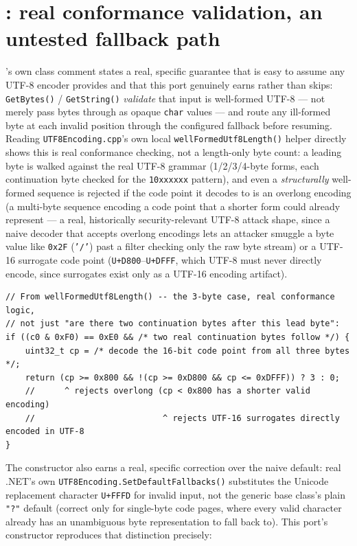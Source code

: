 \section{: real conformance validation, an untested fallback path}

's own class comment states a real, specific guarantee that is
easy to assume any UTF-8 encoder provides and that this port genuinely earns rather than
skips: \texttt{GetBytes()} / \texttt{GetString()} \emph{validate} that input is well-formed
UTF-8 --- not merely pass bytes through as opaque \texttt{char} values --- and route any
ill-formed byte at each invalid position through the configured fallback before resuming.
Reading \texttt{UTF8Encoding.cpp}'s own local \texttt{wellFormedUtf8Length()} helper directly
shows this is real conformance checking, not a length-only byte count: a leading byte is
walked against the real UTF-8 grammar (1/2/3/4-byte forms, each continuation byte checked for
the \texttt{10xxxxxx} pattern), and even a \emph{structurally} well-formed sequence is rejected
if the code point it decodes to is an overlong encoding (a multi-byte sequence encoding a code
point that a shorter form could already represent --- a real, historically security-relevant
UTF-8 attack shape, since a naive decoder that accepts overlong encodings lets an attacker
smuggle a byte value like \texttt{0x2F} (\texttt{'/'}) past a filter checking only the raw byte
stream) or a UTF-16 surrogate code point (\texttt{U+D800}--\texttt{U+DFFF}, which UTF-8 must
never directly encode, since surrogates exist only as a UTF-16 encoding artifact).

\begin{lstlisting}
// From wellFormedUtf8Length() -- the 3-byte case, real conformance logic,
// not just "are there two continuation bytes after this lead byte":
if ((c0 & 0xF0) == 0xE0 && /* two real continuation bytes follow */) {
    uint32_t cp = /* decode the 16-bit code point from all three bytes */;
    return (cp >= 0x800 && !(cp >= 0xD800 && cp <= 0xDFFF)) ? 3 : 0;
    //      ^ rejects overlong (cp < 0x800 has a shorter valid encoding)
    //                          ^ rejects UTF-16 surrogates directly encoded in UTF-8
}
\end{lstlisting}

The constructor also earns a real, specific correction over the naive default: real .NET's own
\texttt{UTF8Encoding.SetDefaultFallbacks()} substitutes the Unicode replacement character
\texttt{U+FFFD} for invalid input, not the generic  base class's plain
\texttt{"?"} default (correct only for single-byte code pages, where every valid character
already has an unambiguous byte representation to fall back to). This port's constructor
reproduces that distinction precisely:


